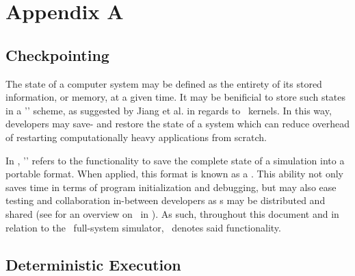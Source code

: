 
\chapter*{Appendix A}
\label{cha:appendixa}

\section*{Checkpointing}
\label{sec:appendixa_checkpointing}

The state of a computer system may be defined as the entirety of its stored information, or memory, at a given time.
It may be benificial to store such states in a '\dvttermcheckpointrestart ' scheme, as suggested by Jiang et al. in regards to \dvttermcuda\ kernels.
In this way, developers may save- and restore the state of a system which can reduce overhead of restarting computationally heavy applications from scratch.

In \dvttermsimics , '\dvttermcheckpointing ' refers to the functionality to save the complete state of a simulation into a portable format.
When applied, this format is known as a \dvttermcheckpoint .
This ability not only  saves time in terms of program initialization and debugging, but may also ease testing and collaboration in-between developers as \dvttermcheckpoint s may be distributed and shared (see  for an overview on \dvttermcheckpointing\ in \dvttermsimics ).
As such, throughout this document and in relation to the \dvttermsimics\ full-system simulator, \dvttermcheckpointing\ denotes said functionality.

\section*{Deterministic Execution}
\label{sec:appendixa_deterministicexecution}

